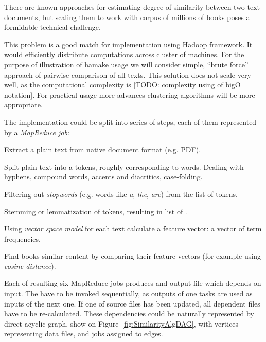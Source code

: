 \documentclass[10pt,conference,letterpaper]{IEEEtran}
\begin{document}
There are known approaches for estimating degree of similarity between
two text documents, but scaling them to work with corpus of millions
of books poses a formidable technical challenge.

This problem is a good match for implementation using Hadoop
framework. It would efficiently distribute computations across cluster
of machines. For the purpose of illustration of hamake usage we will
consider simple, ``brute force'' approach of pairwise comparison of
all texts. This solution does not scale very well, as the
computational complexity is [TODO: complexity using of bigO
notation]. For practical usage more advances clustering algorithms
will be more appropriate.

The implementation could be split into series of steps, each of them
represented by a \textit{MapReduce job}:

\begin{description}
\item[\emph{ExtractText}] Extract a plain text from native document format
  (e.g. PDF).
\item[\emph{Tokenize}] Split plain text into a tokens, roughly
  corresponding to words. Dealing with hyphens, compound words,
  accents and diacritics, case-folding.
\item[\emph{FilterStopwords}] Filtering out \textit{stopwords} (e.g. words
  like \textit{a}, \textit{the}, \textit{are}) from the list of
  tokens.
\item[\emph{Normalize}] Stemming or lemmatization of tokens,
  resulting in list of .
\item[\emph{CalculateTF}] Using \textit{vector space
    model}\cite{manning2008introduction} for each text calculate a
  feature vector: a vector of term frequencies.
\item[\emph{FindSimilar}] Find books similar content by comparing
  their feature vectors (for example using \textit{cosine
  distance}).
\end{description}

Each of resulting six MapReduce jobs produces and output file which
depends on input. The have to be invoked sequentially, as outputs of
one tasks are used as inputs of the next one. If one of source files
has been updated, all dependent files have to be re-calculated. These
dependencies could be naturally represented by direct acyclic graph,
show on Figure~\ref{fig:SimilarityAlgDAG}, with vertices representing
data files, and jobs assigned to edges.
\end{document}
